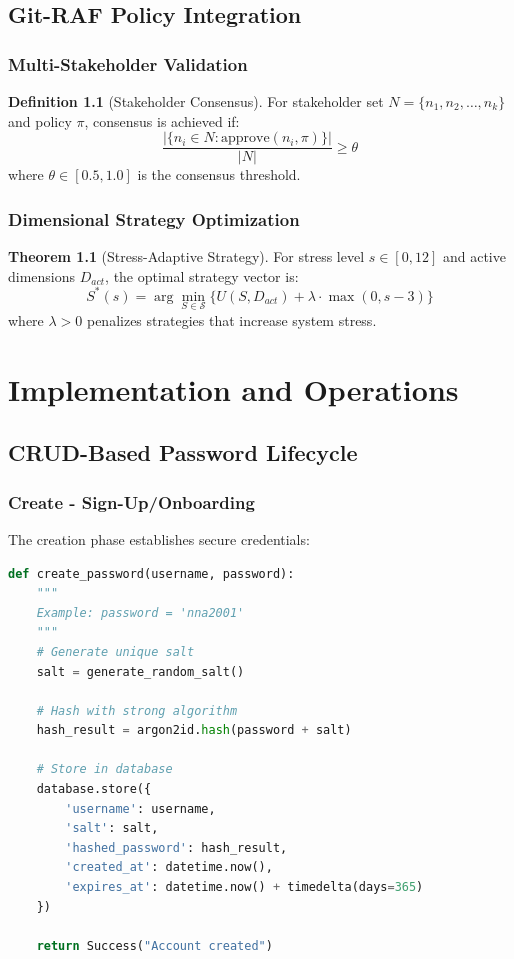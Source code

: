 \documentclass[12pt,a4paper]{report}
\theoremstyle{definition}
\newtheorem{definition}{Definition}[chapter]
\newtheorem{theorem}{Theorem}[chapter]
\begin{document}
\chapter{Git-RAF Policy Integration}

\section{Multi-Stakeholder Validation}

\begin{definition}[Stakeholder Consensus]
For stakeholder set $N = \{n_1, n_2, \ldots, n_k\}$ and policy $\pi$, consensus is achieved if:
$$\frac{|\{n_i \in N : \text{approve}(n_i, \pi)\}|}{|N|} \geq \theta$$
where $\theta \in [0.5, 1.0]$ is the consensus threshold.
\end{definition}

\section{Dimensional Strategy Optimization}

\begin{theorem}[Stress-Adaptive Strategy]
For stress level $s \in [0, 12]$ and active dimensions $D_{act}$, the optimal strategy vector is:
$$S^*(s) = \arg\min_{S \in \mathcal{S}} \{U(S, D_{act}) + \lambda \cdot \max(0, s - 3)\}$$
where $\lambda > 0$ penalizes strategies that increase system stress.
\end{theorem}


\part{Implementation and Operations}

\chapter{CRUD-Based Password Lifecycle}

\section{Create - Sign-Up/Onboarding}

The creation phase establishes secure credentials:

\begin{lstlisting}[language=Python, caption=Password Creation]
def create_password(username, password):
    """
    Example: password = 'nna2001'
    """
    # Generate unique salt
    salt = generate_random_salt()
    
    # Hash with strong algorithm
    hash_result = argon2id.hash(password + salt)
    
    # Store in database
    database.store({
        'username': username,
        'salt': salt,
        'hashed_password': hash_result,
        'created_at': datetime.now(),
        'expires_at': datetime.now() + timedelta(days=365)
    })
    
    return Success("Account created")
\end{lstlisting}
\end{document}

